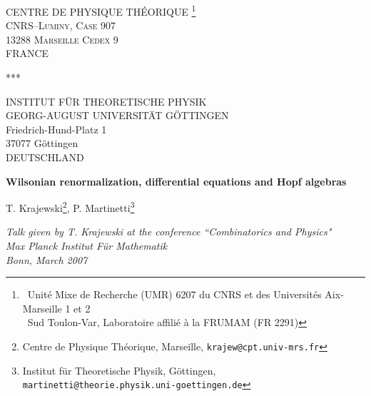 \documentclass[12pt,here,feynmf]{article}
\begin{document}
\begin{center}
%
\scshape
CENTRE DE PHYSIQUE TH\'EORIQUE \footnote{\, Unit\'e Mixe de
Recherche (UMR) 6207 du CNRS et des Universit\'es Aix-Marseille 1 et 2 \\ \indent \quad \, Sud Toulon-Var, Laboratoire affili\'e \`a la 
FRUMAM (FR 2291)} \\ CNRS--Luminy, Case 907\\ 13288 Marseille Cedex 9\\
FRANCE\\
%
\bigskip
\centerline{***}
\bigskip
INSTITUT F\"UR THEORETISCHE PHYSIK\\
GEORG-AUGUST UNIVERSIT\"AT G\"OTTINGEN\\
Friedrich-Hund-Platz 1\\
37077 G\"ottingen\\
DEUTSCHLAND



\end{center}
\vspace{1cm}
\begin{center}
%
{\huge\bfseries Wilsonian renormalization, differential equations and Hopf algebras}
%
\end{center}

\vspace{1cm}


\begin{center}

{\Large T. Krajewski}\footnote{Centre de Physique Th\'eorique, Marseille, {\tt krajew@cpt.univ-mrs.fr}}, 
\quad
{\Large P. Martinetti}\footnote{Institut f\"ur Theoretische Physik, G\"ottingen, {\tt martinetti@theorie.physik.uni-goettingen.de}}  
\vspace{1cm}


\end{center}


\begin{center}
{\it \large Talk given by T. Krajewski at the conference ``Combinatorics and Physics"}\\
\vspace{0.5cm}
{\it \large Max Planck Institut F\"ur Mathematik}\\
\vspace{0.5cm}
{\it \large Bonn, March 2007}\\
\end{center}
\vspace{1cm}


\end{document}
